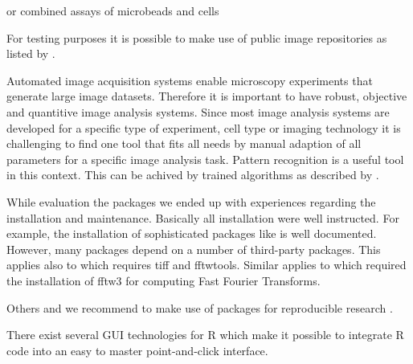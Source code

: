 \citep{rodiger_intestinal_2015} or combined assays of microbeads and cells 
\citep{grossmann_simultaneous_2016, scholz_second_2015}

For testing purposes it is possible to make use of public image repositories as 
listed by \citet{eliceiri_biological_2012}.

Automated image acquisition systems enable microscopy experiments that generate 
large image datasets. Therefore it is important to have robust, objective and 
quantitive image analysis systems. Since most image analysis systems are 
developed for a specific type of experiment, cell type or imaging technology it 
is challenging to find one tool that fits all needs by manual adaption of all 
parameters for a specific image analysis task. Pattern recognition is a useful 
tool in this context. This can be achived by trained algorithms as described by 
\citet{shamir_pattern_2010}. 

While evaluation the packages we ended up with experiences regarding the 
installation and maintenance. Basically all installation were well instructed. 
For example, the installation of sophisticated packages like  
is 
well documented. However, many packages depend on a number of third-party 
packages. This applies also to  which requires tiff and 
fftwtools. Similar applies to  which required the installation 
of fftw3 for computing Fast Fourier Transforms.

Others and we recommend to make use of packages for reproducible research 
\citep{rodiger_r_2015}. 

There exist several GUI technologies for R which make it possible to integrate 
R code into an easy to master point-and-click interface.


